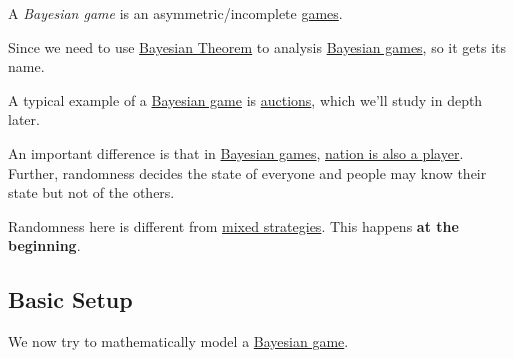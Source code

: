 \begin{definition}\label{def:Bayesian-game}
	A \emph{Bayesian game} is an asymmetric/incomplete \hyperref[def:game]{games}.
\end{definition}
\begin{intuition}
	Since we need to use \href{https://en.wikipedia.org/wiki/Bayes%27_theorem}{Bayesian Theorem} to analysis \hyperref[def:Bayesian-game]{Bayesian games}, so it gets its name.
\end{intuition}

\begin{eg}[Auction]
	A typical example of a \hyperref[def:Bayesian-game]{Bayesian game} is \hyperref[ch:auctions]{auctions}, which we'll study in depth later.
\end{eg}

An important difference is that in \hyperref[def:Bayesian-game]{Bayesian games}, \underline{nation is also a \hyperref[def:player]{player}}. Further, randomness decides the state of everyone and people may know their state but not of the others.

\begin{note}
	Randomness here is different from \hyperref[def:mixed-strategy]{mixed strategies}. This happens \textbf{at the beginning}.
\end{note}

\subsection{Basic Setup}
We now try to mathematically model a \hyperref[def:Bayesian-game]{Bayesian game}.

